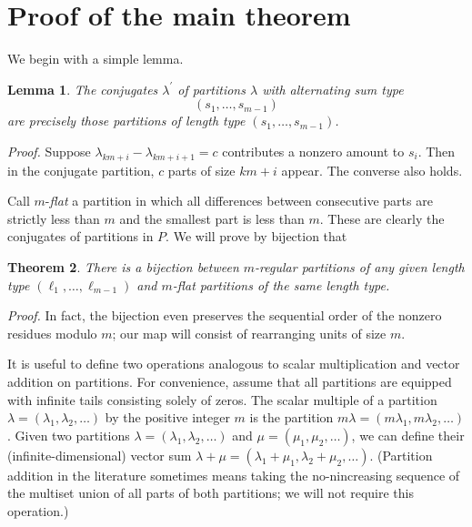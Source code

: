\documentclass[11pt]{article}
\newtheorem{theorem}{Theorem}[section]
\newtheorem{lemma}[theorem]{Lemma}
\begin{document}









\section{Proof of the main theorem}

We begin with a simple lemma.

\begin{lemma}\label{conj} The conjugates $\lambda^{\prime}$ of partitions $\lambda$ with alternating sum type $$(s_1,\dots,s_{m-1})$$ are precisely those partitions of length type $(s_1,\dots,s_{m-1})$.
\end{lemma}

\emph{Proof.} Suppose $\lambda_{km+i} - \lambda_{km+i+1} = c$ contributes a nonzero amount to $s_i$.  Then in the conjugate partition, $c$ parts of size $km+i$ appear.  The converse also holds.


Call $m$-\emph{flat} a partition in which all differences between consecutive parts are strictly less than $m$ and the smallest part is less than $m$.  These are clearly the conjugates of partitions in $P$.  We will prove by bijection that

\begin{theorem} There is a bijection between $m$-regular partitions of any given length type $(\ell_1,\dots,\ell_{m-1})$ and $m$-flat partitions of the same length type.
\end{theorem}

\emph{Proof.} In fact, the bijection even preserves the sequential order of the nonzero residues modulo $m$; our map will consist of rearranging units of size $m$.

It is useful to define two operations analogous to scalar multiplication and vector addition on partitions.  For convenience, assume that all partitions are equipped with infinite tails consisting solely of zeros.  The scalar multiple of a partition $\lambda = (\lambda_1,\lambda_2,\dots)$ by the positive integer $m$ is the partition $m \lambda = (m \lambda_1,m \lambda_2,\dots)$.  Given two partitions $\lambda = (\lambda_1,\lambda_2,\dots)$ and $\mu = (\mu_1,\mu_2,\dots)$, we can define their (infinite-dimensional) vector sum $\lambda + \mu = (\lambda_1+\mu_1,\lambda_2 + \mu_2,\dots)$.  (Partition addition in the literature sometimes means taking the no-nincreasing sequence of the multiset union of all parts of both partitions; we will not require this operation.)
\end{document}
